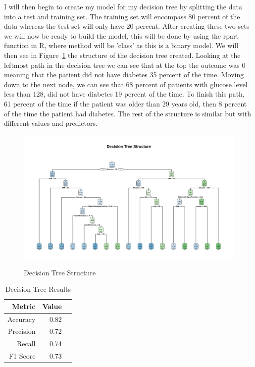 \documentclass[12pt]{article}
\begin{document}
    I will then begin to create my model for my decision tree by
    splitting the data into a test and training set. The training set will encompass 80 percent of the data whereas the test set will
    only have 20 percent. After creating these two sets we will now be ready to build the model, this will be done by using the rpart
    function in R, where method will be 'class' as this is a binary model. We will then see in Figure~\ref{fig:structure} the structure
    of the decision tree created. Looking at the leftmost path in the decision tree we can see that at the top the outcome was 0 meaning 
    that the patient did not have diabetes 35 percent of the time. Moving down to the next node, we can see that 68 percent of patients with
    glucose level less than 128, did not have diabetes 19 percent of the time. To finish this path, 61 percent of the time if the patient was
    older than 29 years old, then 8 percent of the time the patient had diabetes. The rest of the structure is similar but with different 
    values and predictors.



\begin{figure}[tbp]
  \centering
  \caption{Decision Tree Structure}
  \includegraphics[width=\textwidth]{Decision Tree Structure.pdf}
  \label{fig:structure}
  \end{figure}

\begin{table}[ht]
    \centering
    \caption{Decision Tree Results}
    \label{tab:dtr} 
    \begin{tabular}{rrr}
      \toprule
      Metric & Value\\
      \midrule
      Accuracy & 0.82\\
      Precision & 0.72\\
      Recall & 0.74\\
      F1 Score & 0.73\\
      \bottomrule
      \end{tabular}
    \end{table}
\end{document}
